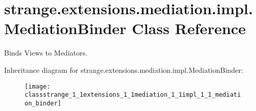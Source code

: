 \hypertarget{classstrange_1_1extensions_1_1mediation_1_1impl_1_1_mediation_binder}{\section{strange.\-extensions.\-mediation.\-impl.\-Mediation\-Binder Class Reference}
\label{classstrange_1_1extensions_1_1mediation_1_1impl_1_1_mediation_binder}
}


Binds Views to Mediators.  


Inheritance diagram for strange.\-extensions.\-mediation.\-impl.\-Mediation\-Binder\-:\begin{figure}[H]
\begin{center}
\leavevmode
\texttt{[image: classstrange\_1\_1extensions\_1\_1mediation\_1\_1impl\_1\_1\_mediation\_binder]}
\end{center}
\end{figure}
